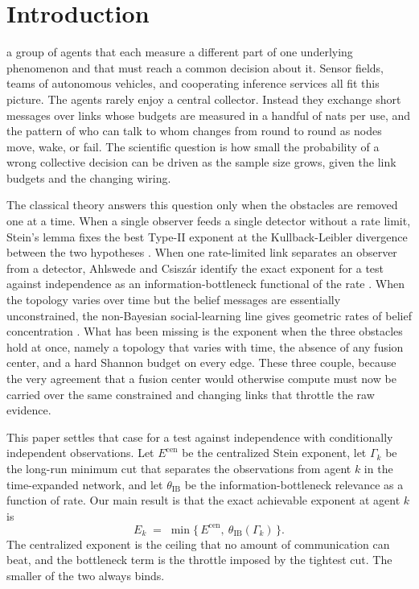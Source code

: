 \documentclass[journal]{IEEEtran}
\theoremstyle{definition}
\theoremstyle{remark}
\newcommand{\Ecen}{E^{\mathrm{cen}}}
\newcommand{\tib}{\theta_{\mathrm{IB}}}
\newcommand{\Gk}{\Gamma_k}
\begin{document}
\section{Introduction}
 a group of agents that each measure a different part of one underlying phenomenon and
that must reach a common decision about it. Sensor fields, teams of autonomous vehicles, and cooperating
inference services all fit this picture. The agents rarely enjoy a central collector. Instead they exchange short
messages over links whose budgets are measured in a handful of nats per use, and the pattern of who can talk to
whom changes from round to round as nodes move, wake, or fail. The scientific question is how small the
probability of a wrong collective decision can be driven as the sample size grows, given the link budgets and the
changing wiring.

The classical theory answers this question only when the obstacles are removed one at a time. When a single
observer feeds a single detector without a rate limit, Stein's lemma fixes the best Type-II exponent at the
Kullback-Leibler divergence between the two hypotheses \cite{chernoff1952,coverthomas2006}. When one rate-limited
link separates an observer from a detector, Ahlswede and Csisz\'ar identify the exact exponent for a test against
independence as an information-bottleneck functional of the rate \cite{ahlswedecsiszar1986}. When the topology
varies over time but the belief messages are essentially unconstrained, the non-Bayesian social-learning line
gives geometric rates of belief concentration \cite{nou2017,lalitha2018,shahrampour2016}. What has been missing
is the exponent when the three obstacles hold at once, namely a topology that varies with time, the absence of
any fusion center, and a hard Shannon budget on every edge. These three couple, because the very agreement that a
fusion center would otherwise compute must now be carried over the same constrained and changing links that
throttle the raw evidence.

This paper settles that case for a test against independence with conditionally independent observations. Let
$\Ecen$ be the centralized Stein exponent, let $\Gk$ be the long-run minimum cut that separates the observations
from agent $k$ in the time-expanded network, and let $\tib$ be the information-bottleneck relevance as a function
of rate. Our main result is that the exact achievable exponent at agent $k$ is
\begin{equation}
E_k \;=\; \min\{\,\Ecen,\ \tib(\Gk)\,\}. \label{eq:main}
\end{equation}
The centralized exponent is the ceiling that no amount of communication can beat, and the bottleneck term is the
throttle imposed by the tightest cut. The smaller of the two always binds.
\end{document}
